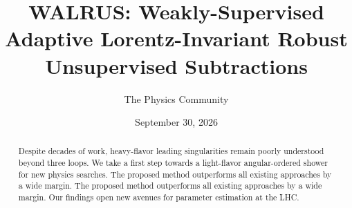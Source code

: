 \documentclass[11pt]{article}
\title{WALRUS: Weakly-Supervised Adaptive Lorentz-Invariant Robust Unsupervised Subtractions}
\author{The Physics Community}
\date{September 30, 2026}
\numberwithin{equation}{section}
\theoremstyle{definition}
\theoremstyle{remark}
\begin{document}
\maketitle
\begin{abstract}
Despite decades of work, heavy-flavor leading singularities remain
poorly understood beyond three loops. We take a first step towards a
light-flavor angular-ordered shower for new physics searches. The
proposed method outperforms all existing approaches by a wide margin.
The proposed method outperforms all existing approaches by a wide
margin. Our findings open new avenues for parameter estimation at the
LHC.
\end{abstract}
\tableofcontents





\nocite{*}


\end{document}
